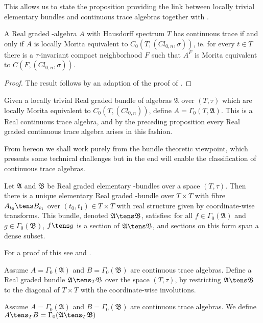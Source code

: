 This allows us to state the proposition providing the link between locally trivial elementary \Cstar bundles and continuous trace algebras together with . 
\begin{proposition}
	A Real graded \Cstar-algebra $A$ with Hausdorff spectrum $T$ has continuous trace if and only if $A$ is locally Morita equivalent to $C_0(T,(Cl_{0,n},\sigma))$, ie. for every $t\in T$ there is a $\tau$-invariant compact neighborhood $F$ such that $A^{F}$ is Morita equivalent to $C(F,(Cl_{0,n},\sigma))$. 
\end{proposition}
\begin{proof}
	The result follows by an adaption of the proof of \cite[Proposition 5.15]{raeburncont}.  
\end{proof}
\begin{remark}
	Given a locally trivial Real graded bundle of algebras $\mathfrak{A}$ over $(T,\tau)$ which are locally Morita equivalent to $C_0(T,(Cl_{0,n}))$, define $A=\Gamma_0(T,\mathfrak{A})$. This is a Real continuous trace algebra, and by the preceding proposition every Real graded continuous trace algebra arises in this fashion. 
\end{remark}
From hereon we shall work purely from the bundle theoretic viewpoint, which presents some technical challenges but in the end will enable the classification of continuous trace algebras. 
\begin{lemma}\label{density}
	Let $\mathfrak{A}$ and $\mathfrak{B}$ be Real graded elementary \Cstar-bundles over a space $(T,\tau)$. Then there is a unique elementary Real graded \Cstar-bundle over $T\times T$ with fibre $A_{t_0}\tens B_{t_1}$ over $(t_0,t_1)\in T\times T$ with real structure given by coordinate-wise transforms. This bundle, denoted $\mathfrak{A}\tens \mathfrak{B}$, satisfies: for all $f\in \Gamma_0(\mathfrak{A})$ and $g\in \Gamma_0(\mathfrak{B})$, $f\tens g$ is a section of $\mathfrak{A}\tens \mathfrak{B}$, and sections on this form span a dense subset. 
\end{lemma}
For a proof of this see \cite{moutou} and \cite[Chapter 5]{raeburncont}. 
\begin{definition}
	Assume $A=\Gamma_0(\mathfrak{A})$ and $B=\Gamma_0(\mathfrak{B})$ are continuous trace algebras. Define a Real graded \Cstar bundle $\mathfrak{A}\tens_T \mathfrak{B}$ over the space $(T,\tau)$, by restricting $\mathfrak{A}\tens \mathfrak{B}$ to the diagonal of $T\times T$ with the coordinate-wise involutions.   
\end{definition}
\begin{definition}
	Assume $A=\Gamma_0(\mathfrak{A})$ and $B=\Gamma_0(\mathfrak{B})$ are continuous trace algebras.	We define $A\tens_T B=\Gamma_0(\mathfrak{A}\tens_T \mathfrak{B})$
	
\end{definition}
